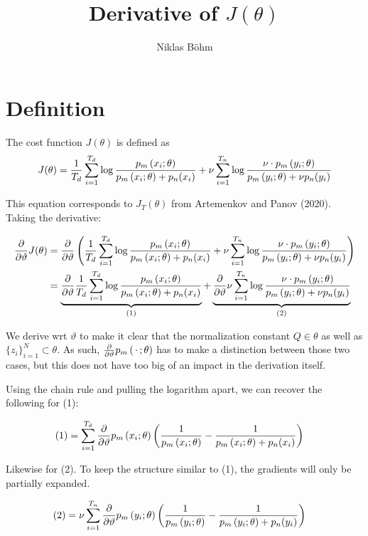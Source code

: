 \documentclass[a4paper,12pt]{article}
\author{Niklas Böhm}
\title{Derivative of $J(\theta)$}
\newcommand{\pmodel}[1]{\ensuremath p_m\left(#1; \theta\right)}
\newcommand{\pnoise}[1]{\ensuremath p_n(#1)}
\newcommand{\dtheta}{\ensuremath \frac{\partial}{\partial\vartheta}}
\begin{document}
\maketitle

\section*{Definition}

The cost function $J(\theta)$ is defined as
\begin{align*}
  J(\theta) = \frac{1}{T_d} \sum_{i=1}^{T_d} \log \frac{\pmodel{x_i}}{\pmodel{x_i} + \pnoise{x_i}}
              + \nu \sum_{i=1}^{T_n} \log \frac{\nu \cdot \pmodel{y_i}}{\pmodel{y_i} + \nu\pnoise{y_i}}
\end{align*}

\noindent This equation corresponds to $J_T(\theta)$ from Artemenkov and Panov (2020).  Taking the derivative:

\begin{align*}
  \dtheta J(\theta) &= \dtheta \left( \frac{1}{T_d} \sum_{i=1}^{T_d} \log \frac{\pmodel{x_i}}{\pmodel{x_i} + \pnoise{x_i}}
                      + \nu \sum_{i=1}^{T_n} \log \frac{\nu \cdot \pmodel{y_i}}{\pmodel{y_i} + \nu\pnoise{y_i}} \right) \\
                    &= \underbrace{\dtheta\frac{1}{T_d} \sum_{i=1}^{T_d} \log \frac{\pmodel{x_i}}{\pmodel{x_i} + \pnoise{x_i}}}_{(1)}
                      + \underbrace{\dtheta\nu \sum_{i=1}^{T_n} \log \frac{\nu \cdot \pmodel{y_i}}{\pmodel{y_i} + \nu\pnoise{y_i}}}_{(2)}
\end{align*}

\noindent We derive wrt $\vartheta$ to make it clear that the
normalization constant $Q\in\theta$ as well as
$\{z_i\}_{i=1}^{N}\subset\theta$. As such, $\dtheta \pmodel{\,\cdot\,}$
has to make a distinction between those two cases, but this does not
have too big of an impact in the derivation itself.

\goodbreak
Using the chain rule and pulling the logarithm apart, we can recover the following for (1):

\begin{align*}
  (1) &= \sum_{i=1}^{T_d} \dtheta\pmodel{x_i} \left(  \frac{1}{\pmodel{x_i}} - \frac{1}{\pmodel{x_i} + \pnoise{x_i}}\right)
\end{align*}

Likewise for (2).  To keep the structure similar to (1), the gradients will only be partially expanded.

\begin{align*}
  (2) &= \nu \sum_{i=1}^{T_n} \dtheta\pmodel{y_i} \left(  \frac{1}{\pmodel{y_i}} - \frac{1}{\pmodel{y_i} + \pnoise{y_i}}\right)
\end{align*}
\end{document}
